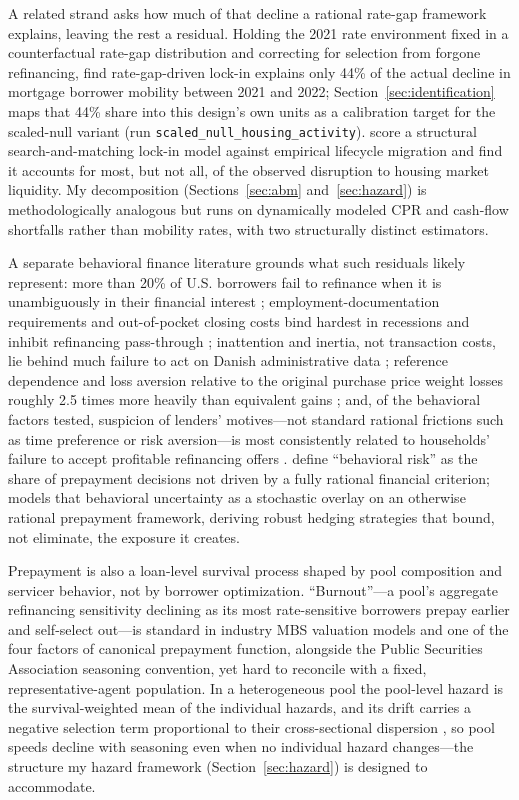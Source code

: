 A related strand asks how much of that decline a rational rate-gap framework explains, leaving the rest a residual. Holding the 2021 rate environment fixed in a counterfactual rate-gap distribution and correcting for selection from forgone refinancing, \citet{aladangady2024} find rate-gap-driven lock-in explains only 44\% of the actual decline in mortgage borrower mobility between 2021 and 2022; Section~\ref{sec:identification} maps that 44\% share into this design's own units as a calibration target for the scaled-null variant (run \texttt{scaled\_null\_housing\_activity}). \citet{gerardi2024} score a structural search-and-matching lock-in model against empirical lifecycle migration and find it accounts for most, but not all, of the observed disruption to housing market liquidity. My decomposition (Sections~\ref{sec:abm} and~\ref{sec:hazard}) is methodologically analogous but runs on dynamically modeled CPR and cash-flow shortfalls rather than mobility rates, with two structurally distinct estimators.

A separate behavioral finance literature grounds what such residuals likely represent: more than 20\% of U.S. borrowers fail to refinance when it is unambiguously in their financial interest \citep{keys2016}; employment-documentation requirements and out-of-pocket closing costs bind hardest in recessions and inhibit refinancing pass-through \citep{defusco2020}; inattention and inertia, not transaction costs, lie behind much failure to act on Danish administrative data \citep{andersen2020}; reference dependence and loss aversion relative to the original purchase price weight losses roughly 2.5 times more heavily than equivalent gains \citep{andersen2022}; and, of the behavioral factors tested, suspicion of lenders' motives---not standard rational frictions such as time preference or risk aversion---is most consistently related to households' failure to accept profitable refinancing offers \citep{johnson2019}. \citet{bissiri2014} define ``behavioral risk'' as the share of prepayment decisions not driven by a fully rational financial criterion; \citet{perotti2024} models that behavioral uncertainty as a stochastic overlay on an otherwise rational prepayment framework, deriving robust hedging strategies that bound, not eliminate, the exposure it creates.

Prepayment is also a loan-level survival process shaped by pool composition and servicer behavior, not by borrower optimization. ``Burnout''---a pool's aggregate refinancing sensitivity declining as its most rate-sensitive borrowers prepay earlier and self-select out---is standard in industry MBS valuation models and one of the four factors of  canonical prepayment function, alongside the Public Securities Association seasoning convention, yet hard to reconcile with a fixed, representative-agent population. In a heterogeneous pool the pool-level hazard is the survival-weighted mean of the individual hazards, and its drift carries a negative selection term proportional to their cross-sectional dispersion \citep[arXiv preprint]{lesniewski2026}, so pool speeds decline with seasoning even when no individual hazard changes---the structure my hazard framework (Section~\ref{sec:hazard}) is designed to accommodate.

